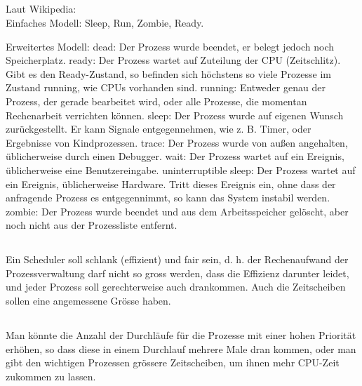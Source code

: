\subsection{}
\begin{answer}
Laut Wikipedia:\\
Einfaches Modell:
Sleep, Run, Zombie, Ready.

Erweitertes Modell:
dead: Der Prozess wurde beendet, er belegt jedoch noch Speicherplatz.
ready: Der Prozess wartet auf Zuteilung der CPU (Zeitschlitz). Gibt es den Ready-Zustand, so befinden sich höchstens so viele Prozesse im Zustand running, wie CPUs vorhanden sind.
running: Entweder genau der Prozess, der gerade bearbeitet wird, oder alle Prozesse, die momentan Rechenarbeit verrichten können.
sleep: Der Prozess wurde auf eigenen Wunsch zurückgestellt. Er kann Signale entgegennehmen, wie z. B. Timer, oder Ergebnisse von Kindprozessen.
trace: Der Prozess wurde von außen angehalten, üblicherweise durch einen Debugger.
wait: Der Prozess wartet auf ein Ereignis, üblicherweise eine Benutzereingabe.
uninterruptible sleep: Der Prozess wartet auf ein Ereignis, üblicherweise Hardware. Tritt dieses Ereignis ein, ohne dass der anfragende Prozess es entgegennimmt, so kann das System instabil werden.
zombie: Der Prozess wurde beendet und aus dem Arbeitsspeicher gelöscht, aber noch nicht aus der Prozessliste entfernt.
\end{answer}

\subsection{}
\begin{answer}
Ein Scheduler soll schlank (effizient) und fair sein, d. h. der Rechenaufwand der Prozessverwaltung
darf nicht so gross werden, dass die Effizienz darunter leidet, und jeder Prozess soll
gerechterweise auch drankommen. Auch die Zeitscheiben sollen eine angemessene Grösse
haben.
\end{answer}

\subsection{}
\begin{answer}
Man könnte die Anzahl der Durchläufe für die Prozesse mit einer hohen Priorität erhöhen,
so dass diese in einem Durchlauf mehrere Male dran kommen, oder man gibt den wichtigen
Prozessen grössere Zeitscheiben, um ihnen mehr CPU-Zeit zukommen zu lassen.
\end{answer}

